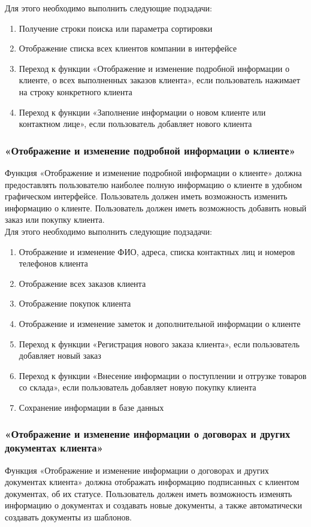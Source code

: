 \documentclass[a4paper,12pt]{article}
\begin{document}
Для этого необходимо выполнить следующие подзадачи:
\begin{enumerate}
    \item Получение строки поиска или параметра сортировки
    \item Отображение списка всех клиентов компании в интерфейсе
    \item Переход к функции «Отображение и изменение подробной информации о клиенте, о всех выполненных заказов клиента», если пользователь нажимает на строку конкретного клиента
    \item Переход к функции «Заполнение информации о новом клиенте или контактном лице», если пользователь добавляет нового клиента
\end{enumerate}

\subsubsection{«Отображение и изменение подробной информации о клиенте»}
Функция «Отображение и изменение подробной информации о клиенте» должна предоставлять пользователю наиболее полную информацию о клиенте в удобном графическом интерфейсе. Пользователь должен иметь возможность изменить информацию о клиенте. Пользователь должен иметь возможность добавить новый заказ или покупку клиента.\\

Для этого необходимо выполнить следующие подзадачи:
\begin{enumerate}
    \item Отображение и изменение ФИО, адреса, списка контактных лиц и номеров телефонов клиента
    \item Отображение всех заказов клиента
    \item Отображение покупок клиента
    \item Отображение и изменение заметок и дополнительной информации о клиенте
    \item Переход к функции «Регистрация нового заказа клиента», если пользователь добавляет новый заказ
    \item Переход к функции «Внесение информации о поступлении и отгрузке товаров со склада», если пользователь добавляет новую покупку клиента
    \item Сохранение информации в базе данных
\end{enumerate}

\subsubsection{«Отображение и изменение информации о договорах и других документах клиента»}
Функция «Отображение и изменение информации о договорах и других документах клиента» должна отображать информацию подписанных с клиентом документах, об их статусе. Пользователь должен иметь возможность изменять информацию о документах и создавать новые документы, а также автоматически создавать документы из шаблонов.\\
\end{document}
